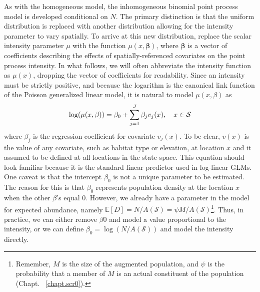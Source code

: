 As with the homogeneous model, the inhomogeneous binomial point process
model is developed conditional on $N$. The primary distinction is that
the uniform distribution is replaced with another distribution
allowing for the intensity parameter to vary spatially. To arrive at
this new distribution, replace the scalar intensity parameter $\mu$
with the function $\mu(x, {\bm \beta})$, where $\bm \beta$ is a
vector of coefficients describing the effects of
spatially-referenced covariates on the point process intensity. In
what follows, we will often abbreviate the intensity function as $\mu(x)$,
dropping the vector of coefficients for readability. Since an intensity must be strictly
positive, and because the logarithm is the canonical link function of the Poisson
generalized linear model, it is natural to model $\mu(x, \beta)$ as
\[
\log(\mu(x, \beta)) = \beta_0 + \sum_{j=1}^J \beta_j v_j(x), \quad  x \in \cal{S}
\]
where $\beta_j$ is the regression coefficient for covariate
$v_j(x)$. To be clear, $v(x)$ is the value of any covariate, such as
habitat type or elevation, at location $x$ and it assumed to be
defined at all locations in the state-space.
This equation should look
familiar because it is the standard linear predictor used in log-linear
GLMs. One caveat is that the intercept $\beta_0$ is not a
unique parameter to be estimated.
The reason for this is that %
$\beta_0$ represents population density at the location $x$ when
the other $\beta$'s equal 0. However, we already
have a parameter in the model for expected abundance, namely $\mathbb{E}[D] =
N/A(\mathcal{S}) =  \psi M / A(\mathcal{S})$\footnote{Remember, $M$ is the size of the augmented population, and
$\psi$ is the probability that a member of $M$ is an actual
constituent of the population (Chapt. ~\ref{chapt.scr0}).}. Thus, in
practice, we can either remove $\beta0$ and model a value proportional
to the intensity, or we can define $\beta_0=\log(N/A(\mathcal{S}))$ and model the
intensity directly.

